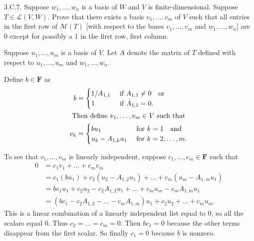 \documentclass[a5paper]{article}
\begin{document}
\newcommand   \C           {\mathbf{C}}
\newcommand   \R           {\mathbf{R}}
\renewcommand \L           {\mathcal{L}}
\newcommand   \F           {\mathbf{F}}
\renewcommand \P           {\mathcal{P}}
\newcommand   \M           {\mathcal{M}}
\newcommand   \op          {\operatorname}

    3.C.7.
    Suppose $w_1,\dots,w_n$ is a basis of $W$ and $V$ is finite-dimensional.
    Suppose $T \in \L(V,W)$.
    Prove that there exists a basis $v_1,\dots,v_m$ of $V$ such that all entries in the first row of $\M(T)$ [with respect to the bases $v_1,\dots,v_m$ and $w_1,\dots,w_n$] are 0 except for possibly a 1 in the first row, first column.

    Suppose $u_1,\dots,u_m$ is a basis of $V$.
    Let $A$ denote the matrix of $T$ defined with respect to $u_1,\dots,u_m$ and $w_1,\dots,w_n$.

    Define $b \in \F$ as
\begin{align*}
        b &=
        \begin{cases}
            1/A_{1,1} \    &\text{if}\ A_{1,1} \neq 0 \quad\text{or} \\
            1         \    &\text{if}\ A_{1,1} = 0 .
        \end{cases} \\
\intertext{
    Then define $v_1,\dots,v_m \in V$ such that
}
        v_k &=
        \begin{cases}
            b u_1            \    &\text{for}\ k = 1 \quad\text{and} \\
            u_k - A_{1,k}u_1 \    &\text{for}\ k = 2,\dots,m .
        \end{cases}
\end{align*}

    To see that $v_1,\dots,v_m$ is linearly independent, suppose $c_1,\dots,c_m \in \F$ such that
\begin{align*}
        0 &= c_1v_1 + \dots + c_mv_m   \\
          &= c_1(b u_1) + c_2(u_2 - A_{1,2}u_1) + \dots + c_m(u_m - A_{1,m}u_1) \\
          &= b c_1u_1 + c_2u_2 - c_2A_{1,2}u_1 + \dots + c_mu_m - c_mA_{1,m}u_1 \\
          &= (b c_1 - c_2A_{1,2} - \dots - c_mA_{1,m})u_1 + c_2u_2 + \dots + c_mu_m .
\end{align*}
    This is a linear combination of a linearly independent list equal to 0, so all the scalars equal 0.
    Thus $c_2=\dots=c_m=0$.
    Then $bc_1=0$ because the other terms disappear from the first scalar.
    So finally $c_1=0$ because $b$ is nonzero.
\end{document}
